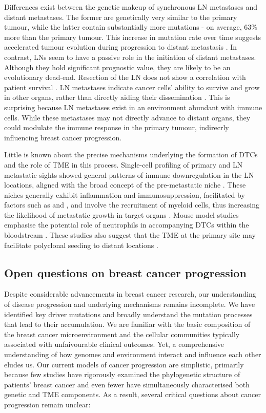 Differences exist between the genetic makeup of synchronous \acf{LN} metastases and distant metastases. The former are genetically very similar to the primary tumour, while the latter contain substantially more mutations - on average, 63\% more than the primary tumour. This increase in mutation rate over time suggests accelerated tumour evolution during progression to distant metastasis \parencite{Yates2017-xc}. In contrast, \ac{LN}s seem to have a passive role in the initiation of distant metastases. Although they hold significant prognostic value, they are likely to be an evolutionary dead-end. Resection of the \ac{LN} does not show a correlation with patient survival \parencite{Fisher1977-ua}. \ac{LN} metastases indicate cancer cells' ability to survive and grow in other organs, rather than directly aiding their dissemination \parencite{Ullah2018-xe}. This is surprising because \ac{LN} metastases exist in an environment abundant with immune cells. While these metastases may not directly advance to distant organs, they could modulate the immune response in the primary tumour, indirecrly influencing breast cancer progression.

Little is known about the precise mechanisms underlying the formation of \acp{DTC} and the role of \ac{TME} in this process. Single-cell profiling of primary and \ac{LN} metastatic sights showed general patterns of immune downregulation in the \ac{LN} locations, aligned with the broad concept of the pre-metastatic niche  \parencite{Liu2022-mt}. These niches generally exhibit inflammation and immunosuppression, facilitated by factors such as  and , and involve the recruitment of myeloid cells, thus increasing the likelihood of metastatic growth in target organs \parencite{Peinado2017-hz}. Mouse model studies emphasise the potential role of neutrophils in accompanying \acp{DTC} within the bloodstream  \parencite{Szczerba2019-mt}. These studies also suggest that the \ac{TME} at the primary site may facilitate polyclonal seeding to distant locations \parencite{Cheung2016-nb}.

\subsection{Open questions on breast cancer progression}

Despite considerable advancements in breast cancer research, our understanding of disease progression and underlying mechanisms remains incomplete. We have identified key driver mutations and broadly understand the mutation processes that lead to their accumulation. We are familiar with the basic composition of the breast cancer microenvironment and the cellular communities typically associated with unfaivourable clinical outcomes. Yet, a comprehensive understanding of how genomes and environment interact and influence each other eludes us. Our current models of cancer progression are simplistic, primarily because few studies have rigorously examined the phylogenetic structure of patients' breast cancer and even fewer have simultaneously characterised both genetic and \ac{TME} components. As a result, several critical questions about cancer progression remain unclear:

